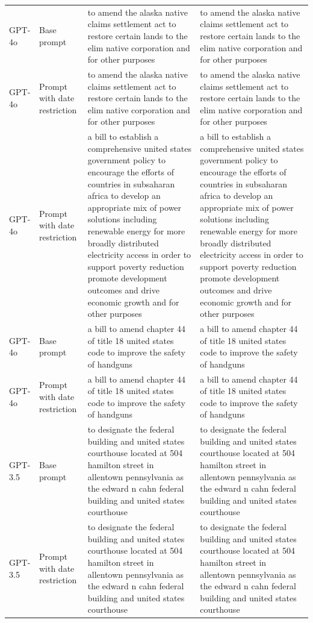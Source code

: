\begin{longtable}{>{\raggedright\arraybackslash}p{1.4cm}>{\raggedright\arraybackslash}p{1.4cm}>{\raggedright\arraybackslash}p{5.5cm}>{\raggedright\arraybackslash}p{5.5cm}}
GPT-4o & Base prompt & to amend the alaska native claims settlement act to restore certain lands to the elim native corporation and for other purposes & to amend the alaska native claims settlement act to restore certain lands to the elim native corporation and for other purposes\\
GPT-4o & Prompt with date restriction & to amend the alaska native claims settlement act to restore certain lands to the elim native corporation and for other purposes & to amend the alaska native claims settlement act to restore certain lands to the elim native corporation and for other purposes\\
GPT-4o & Prompt with date restriction & a bill to establish a comprehensive united states government policy to encourage the efforts of countries in subsaharan africa to develop an appropriate mix of power solutions including renewable energy for more broadly distributed electricity access in order to support poverty reduction promote development outcomes and drive economic growth and for other purposes & a bill to establish a comprehensive united states government policy to encourage the efforts of countries in subsaharan africa to develop an appropriate mix of power solutions including renewable energy for more broadly distributed electricity access in order to support poverty reduction promote development outcomes and drive economic growth and for other purposes\\
GPT-4o & Base prompt & a bill to amend chapter 44 of title 18 united states code to improve the safety of handguns & a bill to amend chapter 44 of title 18 united states code to improve the safety of handguns\\
GPT-4o & Prompt with date restriction & a bill to amend chapter 44 of title 18 united states code to improve the safety of handguns & a bill to amend chapter 44 of title 18 united states code to improve the safety of handguns\\
GPT-3.5 & Base prompt & to designate the federal building and united states courthouse located at 504 hamilton street in allentown pennsylvania as the edward n cahn federal building and united states courthouse & to designate the federal building and united states courthouse located at 504 hamilton street in allentown pennsylvania as the edward n cahn federal building and united states courthouse\\
GPT-3.5 & Prompt with date restriction & to designate the federal building and united states courthouse located at 504 hamilton street in allentown pennsylvania as the edward n cahn federal building and united states courthouse & to designate the federal building and united states courthouse located at 504 hamilton street in allentown pennsylvania as the edward n cahn federal building and united states courthouse\\

\end{longtable}
